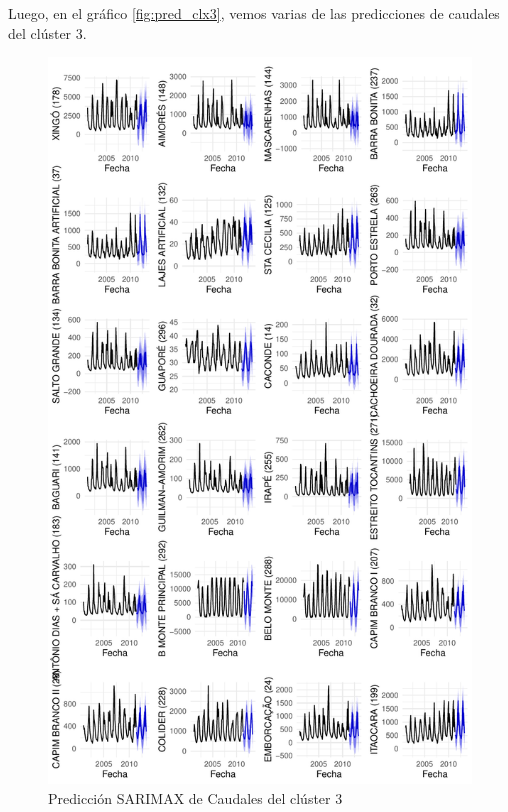 \documentclass[12pt,oneside]{book}\usepackage[]{graphicx}\usepackage[]{color}
\makeatletter
\def\maxwidth{ %
  \ifdim\Gin@nat@width>\linewidth
    \linewidth
  \else
    \Gin@nat@width
  \fi
}
\newenvironment{knitrout}{}{} %
\theoremstyle{definition} %
\makeatother
\begin{document}
Luego, en el gráfico \ref{fig:pred_clx3}, vemos varias de las predicciones de caudales del clúster 3.

\begin{knitrout}
\color{fgcolor}\begin{figure}[h]

{\centering \includegraphics[width=\maxwidth,height=0.85\textheight]{figure/unnamed-chunk-112-1} 

}

\caption{\label{fig:pred_clx3} Predicción SARIMAX de Caudales del clúster 3}\label{fig:unnamed-chunk-112}
\end{figure}


\end{knitrout}
\end{document}
